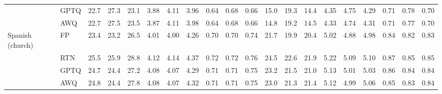\begin{landscape}
\begin{longtable}{llrrrrrrrrrrrrrrrrrr}
 & GPTQ & \cellcolor{loss!1}22.7 & \cellcolor{loss!1}27.3 & \cellcolor{loss!1}23.1 & \cellcolor{loss!4}3.88 & \cellcolor{loss!5}4.11 & \cellcolor{loss!3}3.96 & \cellcolor{loss!5}0.64 & \cellcolor{loss!5}0.68 & \cellcolor{loss!5}0.66 & \cellcolor{loss!0}15.0 & \cellcolor{loss!0}19.3 & \cellcolor{loss!0}14.4 & \cellcolor{loss!1}4.35 & \cellcolor{loss!2}4.75 & \cellcolor{loss!1}4.29 & \cellcolor{loss!5}0.71 & \cellcolor{loss!4}0.78 & \cellcolor{loss!2}0.70 \\
 & AWQ & \cellcolor{loss!1}22.7 & \cellcolor{loss!2}27.5 & \cellcolor{loss!1}23.5 & \cellcolor{loss!4}3.87 & \cellcolor{loss!6}4.11 & \cellcolor{loss!5}3.98 & \cellcolor{loss!5}0.64 & \cellcolor{loss!5}0.68 & \cellcolor{loss!5}0.66 & \cellcolor{loss!0}14.8 & \cellcolor{loss!0}19.2 & \cellcolor{loss!0}14.5 & \cellcolor{loss!1}4.33 & \cellcolor{loss!2}4.74 & \cellcolor{loss!1}4.31 & \cellcolor{loss!4}0.71 & \cellcolor{loss!2}0.77 & \cellcolor{loss!3}0.70 \\
\midrule
Spanish (church) & FP & 23.4 & 23.2 & 26.5 & 4.01 & 4.00 & 4.26 & 0.70 & 0.70 & 0.74 & 21.7 & 19.9 & 20.4 & 5.02 & 4.88 & 4.98 & 0.84 & 0.82 & 0.83 \\
 & RTN & \cellcolor{loss!2}25.5 & \cellcolor{loss!3}25.9 & \cellcolor{loss!3}28.8 & \cellcolor{loss!10}4.12 & \cellcolor{loss!13}4.14 & \cellcolor{loss!10}4.37 & \cellcolor{loss!10}0.72 & \cellcolor{loss!10}0.72 & \cellcolor{loss!10}0.76 & \cellcolor{loss!1}24.5 & \cellcolor{loss!1}22.6 & \cellcolor{loss!1}21.9 & \cellcolor{loss!3}5.22 & \cellcolor{loss!4}5.09 & \cellcolor{loss!2}5.10 & \cellcolor{loss!7}0.87 & \cellcolor{loss!7}0.85 & \cellcolor{loss!5}0.85 \\
 & GPTQ & \cellcolor{loss!2}24.7 & \cellcolor{loss!1}24.4 & \cellcolor{loss!1}27.2 & \cellcolor{loss!6}4.08 & \cellcolor{loss!6}4.07 & \cellcolor{loss!3}4.29 & \cellcolor{loss!5}0.71 & \cellcolor{loss!5}0.71 & \cellcolor{loss!4}0.75 & \cellcolor{loss!0}23.2 & \cellcolor{loss!1}21.5 & \cellcolor{loss!0}21.0 & \cellcolor{loss!2}5.13 & \cellcolor{loss!2}5.01 & \cellcolor{loss!1}5.03 & \cellcolor{loss!4}0.86 & \cellcolor{loss!4}0.84 & \cellcolor{loss!2}0.84 \\
 & AWQ & \cellcolor{loss!2}24.8 & \cellcolor{loss!1}24.4 & \cellcolor{loss!1}27.8 & \cellcolor{loss!7}4.08 & \cellcolor{loss!6}4.07 & \cellcolor{loss!6}4.32 & \cellcolor{loss!5}0.71 & \cellcolor{loss!5}0.71 & \cellcolor{loss!6}0.75 & \cellcolor{loss!0}23.0 & \cellcolor{loss!0}21.3 & \cellcolor{loss!0}21.4 & \cellcolor{loss!2}5.12 & \cellcolor{loss!2}4.99 & \cellcolor{loss!1}5.06 & \cellcolor{loss!2}0.85 & \cellcolor{loss!3}0.83 & \cellcolor{loss!3}0.84 \\

\end{longtable}
\end{landscape}
